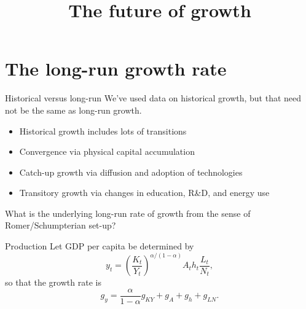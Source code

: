 

\title[Future]{The future of growth}



\maketitle

\section{The long-run growth rate}
\begin{frame}{Historical versus long-run}
We've used data on historical growth, but that need not be the same as long-run growth.
\begin{itemize}
	\item Historical growth includes lots of transitions
	\item Convergence via physical capital accumulation
	\item Catch-up growth via diffusion and adoption of technologies
	\item Transitory growth via changes in education, R\&D, and energy use
\end{itemize}
What is the underlying long-run rate of growth from the sense of Romer/Schumpterian set-up?
\end{frame}

\begin{frame}{Production}
Let GDP per capita be determined by
\begin{equation}
	y_t = \left(\frac{K_t}{Y_t}\right)^{\alpha/(1-\alpha)} A_t h_t \frac{L_t}{N_t}, \nonumber
\end{equation}
so that the growth rate is
\begin{equation}
	g_y = \frac{\alpha}{1-\alpha}g_{KY} + g_A + g_h + g_{LN}. \label{EQ_gy_longrun}
\end{equation}
\end{frame}

